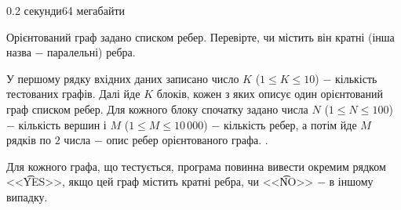 \begin{problem}{}{}{}{0.2 секунди}{64 мегабайти}

Орієнтований граф задано списком ребер. 
Перевірте, чи містить він кратні (інша назва $-$ паралельні) ребра.

\InputFile
У першому рядку вхідних даних записано число $K$ ($1 \le K \le 10$) $-$ кількість тестованих графів. 
Далі йде $K$ блоків, кожен з яких описує один орієнтований граф списком ребер. 
Для кожного блоку спочатку задано числа $N$ ($1 \le N \le 100$) $-$ кількість вершин і $M$ ($1 \le M \le 10\,000$) $-$
кількість ребер, а потім йде $M$ рядків по $2$ числа $-$ опис ребер орієнтованого графа.
.

\OutputFile
Для кожного графа, що тестується, програма повинна вивести окремим рядком <<{\t{YES}}>>,  якщо цей граф
містить кратні ребра, чи <<{\t{NO}}>> $-$ в іншому випадку.

\Example

\begin{example}
%
\end{example}

\end{problem}

